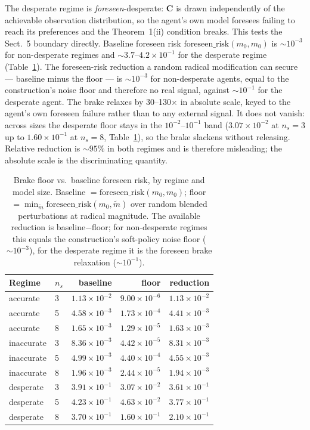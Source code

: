 \documentclass[runningheads]{llncs}
\begin{document}
The desperate regime is \emph{foreseen}-desperate: $\mathbf{C}$ is drawn
independently of the achievable observation distribution, so the agent's
own model foresees failing to reach its preferences and the
Theorem~1(ii) condition breaks. This tests the
Sect.~5 boundary directly. Baseline foreseen risk
$\mathrm{foreseen\_risk}(m_0, m_0)$ is $\sim\!10^{-3}$ for non-desperate
regimes and $\sim\!3.7$--$4.2 \times 10^{-1}$ for the desperate regime
(Table~\ref{tab:brake_floor}). The foreseen-risk reduction a random
radical modification can secure --- baseline minus the floor --- is
$\sim\!10^{-3}$ for non-desperate agents, equal to the construction's
noise floor and therefore no real signal, against $\sim\!10^{-1}$ for the
desperate agent. The brake relaxes by 30--130$\times$ in absolute scale,
keyed to the agent's own foreseen failure rather than to any external
signal. It does not vanish: across sizes the desperate floor stays in the
$10^{-2}$--$10^{-1}$ band ($3.07 \times 10^{-2}$ at $n_s = 3$ up to
$1.60 \times 10^{-1}$ at $n_s = 8$, Table~\ref{tab:brake_floor}), so the
brake slackens without releasing. Relative reduction is $\sim\!95\%$ in both regimes and is
therefore misleading; the absolute scale is the discriminating quantity.
 
\begin{table}[t]
\centering
\caption{Brake floor vs.\ baseline foreseen risk, by regime and model
size. Baseline $=\mathrm{foreseen\_risk}(m_0, m_0)$; floor $= \min_{\tilde
m}\mathrm{foreseen\_risk}(m_0,\tilde m)$ over random blended perturbations
at radical magnitude. The available reduction is baseline$-$floor; for
non-desperate regimes this equals the construction's soft-policy noise
floor ($\sim\!10^{-3}$), for the desperate regime it is the foreseen
brake relaxation ($\sim\!10^{-1}$).}
\label{tab:brake_floor}
\begin{tabular}{llrrr}
\toprule
Regime & $n_s$ & baseline & floor & reduction \\
\midrule
accurate & 3 & $1.13\!\times\!10^{-2}$ & $9.00\!\times\!10^{-6}$ & $1.13\!\times\!10^{-2}$ \\
accurate & 5 & $4.58\!\times\!10^{-3}$ & $1.73\!\times\!10^{-4}$ & $4.41\!\times\!10^{-3}$ \\
accurate & 8 & $1.65\!\times\!10^{-3}$ & $1.29\!\times\!10^{-5}$ & $1.63\!\times\!10^{-3}$ \\
inaccurate & 3 & $8.36\!\times\!10^{-3}$ & $4.42\!\times\!10^{-5}$ & $8.31\!\times\!10^{-3}$ \\
inaccurate & 5 & $4.99\!\times\!10^{-3}$ & $4.40\!\times\!10^{-4}$ & $4.55\!\times\!10^{-3}$ \\
inaccurate & 8 & $1.96\!\times\!10^{-3}$ & $2.44\!\times\!10^{-5}$ & $1.94\!\times\!10^{-3}$ \\
desperate & 3 & $3.91\!\times\!10^{-1}$ & $3.07\!\times\!10^{-2}$ & $3.61\!\times\!10^{-1}$ \\
desperate & 5 & $4.23\!\times\!10^{-1}$ & $4.63\!\times\!10^{-2}$ & $3.77\!\times\!10^{-1}$ \\
desperate & 8 & $3.70\!\times\!10^{-1}$ & $1.60\!\times\!10^{-1}$ & $2.10\!\times\!10^{-1}$ \\
\bottomrule
\end{tabular}
\end{table}
 
\end{document}

